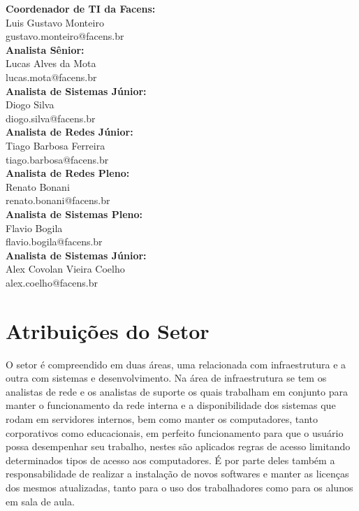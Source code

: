 \documentclass[
	12pt,				%
	oneside,			%
	a4paper,			%
	chapter=TITLE,		%
	section=TITLE,		%
	sumario=tradicional %
	english,			%
	french,				%
	spanish,			%
	brazil				%
	]{abntex2}
\begin{document}
\textbf{Coordenador de TI da Facens:} \\ \indent Luis Gustavo Monteiro \\
\indent gustavo.monteiro@facens.br \\

\textbf{Analista Sênior:} \\ \indent Lucas Alves da Mota \\
\indent lucas.mota@facens.br \\

\textbf{Analista de Sistemas Júnior:} \\ \indent  Diogo Silva \\
\indent diogo.silva@facens.br \\

\textbf{Analista de Redes Júnior:} \\ \indent  Tiago Barbosa Ferreira \\
\indent tiago.barbosa@facens.br \\

\textbf{Analista de Redes Pleno:} \\ \indent  Renato Bonani \\
\indent renato.bonani@facens.br \\

\textbf{Analista de Sistemas Pleno:} \\ \indent  Flavio Bogila \\
\indent flavio.bogila@facens.br \\

\textbf{Analista de Sistemas Júnior:} \\ \indent  Alex Covolan Vieira Coelho \\
\indent alex.coelho@facens.br \\

\section{Atribuições do Setor}
\label{sec:atribsetor}
O setor é compreendido em duas áreas, uma relacionada com infraestrutura e a outra com sistemas e desenvolvimento. Na área de infraestrutura se tem os analistas de rede e os analistas de suporte os quais trabalham em conjunto para manter o funcionamento da rede interna e a disponibilidade dos sistemas que rodam em servidores internos, bem como manter os computadores, tanto corporativos como educacionais, em perfeito funcionamento para que o usuário possa desempenhar seu trabalho, nestes são aplicados regras de acesso limitando determinados tipos de acesso aos computadores. É por parte deles também a responsabilidade de realizar a instalação de novos softwares e manter as licenças dos mesmos atualizadas, tanto para o uso dos trabalhadores como para os alunos em sala de aula.
\end{document}
